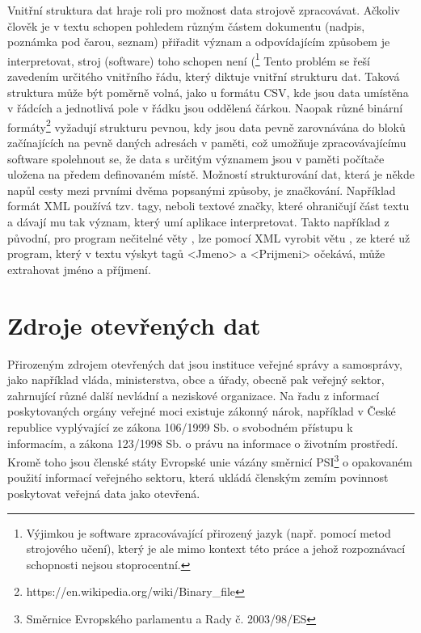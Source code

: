 Vnitřní struktura dat hraje roli pro možnost data strojově zpracovávat. Ačkoliv člověk je v textu schopen pohledem různým částem dokumentu (nadpis, poznámka pod čarou, seznam) přiřadit význam a odpovídajícím způsobem je interpretovat, stroj (software) toho schopen není (\footnote{Výjimkou je software zpracovávající přirozený jazyk (např. pomocí metod strojového učení), který je ale mimo kontext této práce a jehož rozpoznávací schopnosti nejsou stoprocentní.} Tento problém se řeší zavedením určitého vnitřního řádu, který diktuje vnitřní strukturu dat. Taková struktura může být poměrně volná, jako u formátu CSV, kde jsou data umístěna v řádcích a jednotlivá pole v řádku jsou oddělená čárkou. Naopak různé binární formáty\footnote{https://en.wikipedia.org/wiki/Binary\_file} vyžadují strukturu pevnou, kdy jsou data pevně zarovnávána do bloků začínajících na pevně daných adresách v paměti, což umožňuje zpracovávajícímu software spolehnout se, že data s určitým významem jsou v paměti počítače uložena na předem definovaném místě. Možností strukturování dat, která je někde napůl cesty mezi prvními dvěma popsanými způsoby, je značkování. Například formát XML používá tzv. tagy, neboli textové značky, které ohraničují část textu a dávají mu tak význam, který umí aplikace interpretovat. Takto například  z původní, pro program nečitelné věty \textit{}, lze pomocí XML vyrobit větu \textit{}, ze které už program, který v textu výskyt tagů \textsf{<Jmeno>} a \textsf{<Prijmeni>} očekává, může extrahovat jméno a příjmení.

\section{Zdroje otevřených dat}

Přirozeným zdrojem otevřených dat jsou instituce veřejné správy a samosprávy, jako například vláda, ministerstva, obce a úřady, obecně pak veřejný sektor, zahrnující různé další nevládní a neziskové organizace. Na řadu z informací poskytovaných orgány veřejné moci existuje zákonný nárok, například v České republice vyplývající ze zákona 106/1999 Sb. o svobodném přístupu k informacím, a zákona 123/1998 Sb. o právu na informace o životním prostředí. Kromě toho jsou členské státy Evropské unie vázány směrnicí PSI\footnote{Směrnice Evropského parlamentu a Rady č. 2003/98/ES} o opakovaném použití informací veřejného sektoru, která ukládá členským zemím povinnost poskytovat veřejná data jako otevřená.

